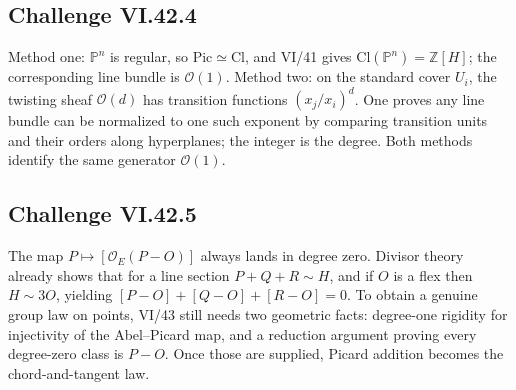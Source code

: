 \subsection*{Challenge VI.42.4}
\begin{solution}
Method one: \(\mathbb P^n\) is regular, so \(\mathrm{Pic}\simeq\mathrm{Cl}\), and VI/41 gives \(\mathrm{Cl}(\mathbb P^n)=\mathbb Z[H]\); the corresponding line bundle is \(\mathcal O(1)\).  Method two: on the standard cover \(U_i\), the twisting sheaf \(\mathcal O(d)\) has transition functions \((x_j/x_i)^d\).  One proves any line bundle can be normalized to one such exponent by comparing transition units and their orders along hyperplanes; the integer is the degree.  Both methods identify the same generator \(\mathcal O(1)\).
\end{solution}

\subsection*{Challenge VI.42.5}
\begin{solution}
The map \(P\mapsto[\mathcal O_E(P-O)]\) always lands in degree zero.  Divisor theory already shows that for a line section \(P+Q+R\sim H\), and if \(O\) is a flex then \(H\sim3O\), yielding \([P-O]+[Q-O]+[R-O]=0\).  To obtain a genuine group law on points, VI/43 still needs two geometric facts: degree-one rigidity for injectivity of the Abel--Picard map, and a reduction argument proving every degree-zero class is \(P-O\).  Once those are supplied, Picard addition becomes the chord-and-tangent law.
\end{solution}

